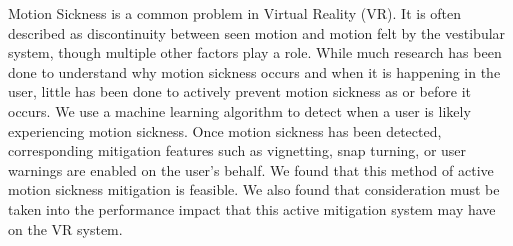 Motion Sickness is a common problem in Virtual Reality (VR).
It is often described as discontinuity between seen motion and motion felt by the vestibular system, though multiple other factors play a role.
While much research has been done to understand why motion sickness occurs and when it is happening in the user, little has been done to actively prevent motion sickness as or before it occurs.
We use a machine learning algorithm to detect when a user is likely experiencing motion sickness.
Once motion sickness has been detected, corresponding mitigation features such as vignetting, snap turning, or user warnings are enabled on the user's behalf.
We found that this method of active motion sickness mitigation is feasible.
We also found that consideration must be taken into the performance impact that this active mitigation system may have on the VR system.
